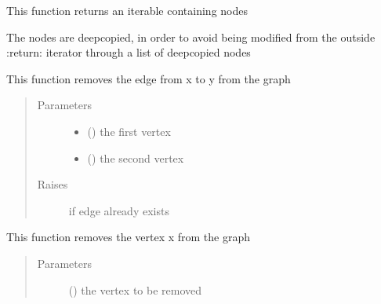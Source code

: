 \documentclass[letterpaper,10pt,english]{sphinxmanual}
\begin{document}
\begin{fulllineitems}

\begin{fulllineitems}
\label{\detokenize{Graph:Graph.Graph.parse_vertices}}
This function returns an iterable containing nodes

The nodes are deepcopied, in order to avoid being modified from the outside
:return: iterator through a list of deepcopied nodes

\end{fulllineitems}


\begin{fulllineitems}
\label{\detokenize{Graph:Graph.Graph.remove_edge}}
This function removes the edge from x to y from the graph
\begin{quote}\begin{description}
\item[{Parameters}] \leavevmode\begin{itemize}
\item {} 
 () \textendash{} the first vertex

\item {} 
 () \textendash{} the second vertex

\end{itemize}

\item[{Raises}] \leavevmode
{} \textendash{} if edge already exists

\end{description}\end{quote}

\end{fulllineitems}


\begin{fulllineitems}
\label{\detokenize{Graph:Graph.Graph.remove_vertex}}
This function removes the vertex x from the graph
\begin{quote}\begin{description}
\item[{Parameters}] \leavevmode
{} () \textendash{} the vertex to be removed


\end{description}
\end{quote}
\end{fulllineitems}
\end{fulllineitems}
\end{document}
